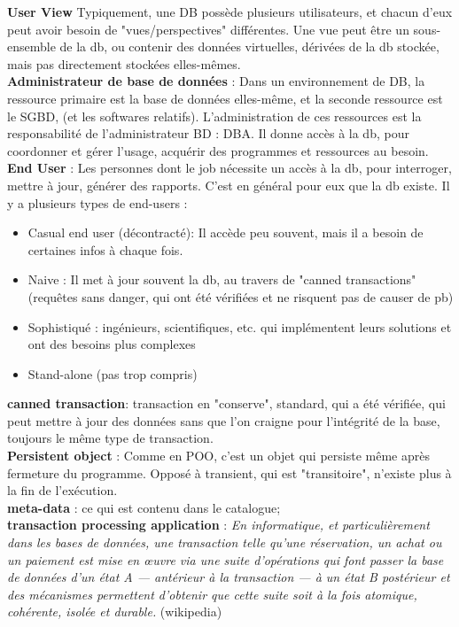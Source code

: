 \textbf{User View} Typiquement, une DB possède plusieurs utilisateurs, et chacun d'eux 
peut avoir besoin de "vues/perspectives" différentes.  
Une vue peut être un sous-ensemble de la db, ou contenir des 
données virtuelles, dérivées de la db stockée, mais pas directement 
stockées elles-mêmes. \\
\textbf{Administrateur de base de données} : Dans un environnement de DB, 
la ressource primaire est la base de données elles-même, et la seconde 
ressource est le SGBD, (et les softwares relatifs). 
L'administration de ces ressources est la responsabilité de 
l'administrateur BD : DBA. 
Il donne accès à la db, pour coordonner et gérer l'usage, acquérir des programmes 
et ressources au besoin. \\
\textbf{End User} : Les personnes dont le job nécessite un accès à la db, 
pour interroger, mettre à jour, générer des rapports. C'est en général 
pour eux que la db existe. Il y a plusieurs types de end-users :
\begin{itemize}
	\item Casual end user (décontracté): Il accède peu souvent, mais il a besoin de certaines infos à chaque fois.
	\item Naive : Il met à jour souvent la db, au travers de "canned transactions" 
	(requêtes sans danger, qui ont été vérifiées et ne risquent pas de causer de pb)
	\item Sophistiqué : ingénieurs, scientifiques, etc. qui implémentent leurs solutions 
	et ont des besoins plus complexes
	\item Stand-alone (pas trop compris)
\end{itemize}
\textbf{canned transaction}: transaction en "conserve", standard, qui a été vérifiée, qui peut mettre à jour des données sans que l'on craigne pour l'intégrité de la base, toujours le même type de transaction.\\
\textbf{Persistent object} : Comme en POO, c'est un objet qui persiste 
même après fermeture du programme. Opposé à transient, qui est "transitoire", n'existe plus à la fin de 
l'exécution.\\
\textbf{meta-data} : ce qui est contenu dans le catalogue;\\
\textbf{transaction processing application} :
\textit{En informatique, et particulièrement dans les bases de données, 
une transaction telle qu'une réservation, un achat ou un paiement est mise en 
œuvre via une suite d'opérations qui font passer la base de données d'un état A 
 — antérieur à la transaction — à un état B postérieur et des mécanismes  permettent d'obtenir que cette suite soit à la fois atomique, cohérente, isolée et durable.} (wikipedia)

